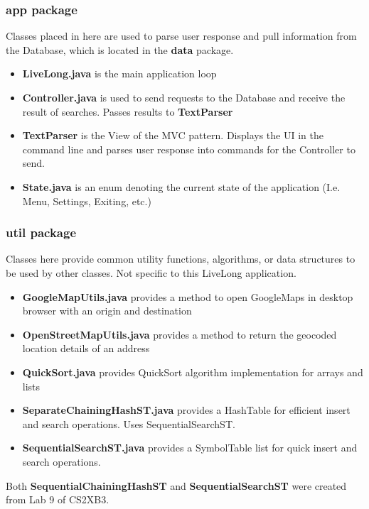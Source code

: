 \documentclass[12pt]{article}
\begin{document}
\subsubsection{app package}
Classes placed in here are used to parse user response and pull information from the Database, which is located in the \textbf{data} package.
\begin{itemize}
\item \textbf{LiveLong.java} is the main application loop
\item \textbf{Controller.java} is used to send requests to the Database and receive the result of searches. Passes results to \textbf{TextParser}
\item \textbf{TextParser} is the View of the MVC pattern. Displays the UI in the command line and parses user response into commands for the Controller to send.
\item \textbf{State.java} is an enum denoting the current state of the application (I.e. Menu, Settings, Exiting, etc.)
\end{itemize}

\subsubsection{util package}
Classes here provide common utility functions, algorithms, or data structures to be used by other classes. Not specific to this LiveLong application.
\begin{itemize}
\item \textbf{GoogleMapUtils.java} provides a method to open GoogleMaps in desktop browser with an origin and destination
\item \textbf{OpenStreetMapUtils.java} provides a method to return the geocoded location details of an address
\item \textbf{QuickSort.java} provides QuickSort algorithm implementation for arrays and lists
\item \textbf{SeparateChainingHashST.java} provides a HashTable for efficient insert and search operations. Uses SequentialSearchST.
\item \textbf{SequentialSearchST.java} provides a SymbolTable list for quick insert and search operations.
\end{itemize}
Both \textbf{SequentialChainingHashST} and \textbf{SequentialSearchST} were created from Lab 9 of CS2XB3.
\end{document}
